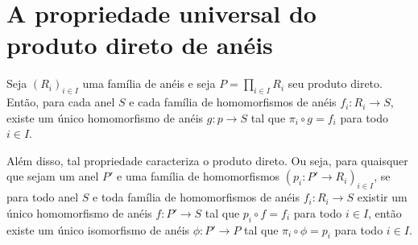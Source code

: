 \section{A propriedade universal do produto direto de anéis}
\begin{theorem}
    Seja $(R_i)_{i \in I}$ uma família de anéis e seja $P=\prod_{i \in I}R_i$ seu produto direto.
    Então, para cada anel $S$ e cada família de homomorfismos de anéis $f_i:R_i\rightarrow S$, existe um único homomorfismo de anéis $g:p\rightarrow S$ tal que $\pi_i\circ g=f_i$ para todo $i \in I$.
    \begin{figure}[H]
        \centering
    \end{figure}

    Além disso, tal propriedade caracteriza o produto direto. Ou seja, para quaisquer que sejam um anel $P'$ e uma família de homomorfismos $(p_i:P'\rightarrow R_i)_{i \in I}$, se para todo anel $S$ e toda família de homomorfismos de anéis $f_i:R_i\rightarrow S$ existir um único homomorfismo de anéis $f:P'\rightarrow S$ tal que $p_i\circ f=f_i$ para todo $i \in I$,
    então existe um único isomorfismo de anéis $\phi: P'\rightarrow P$ tal que $\pi_i\circ \phi=p_i$ para todo $i \in I$.
\end{theorem}

